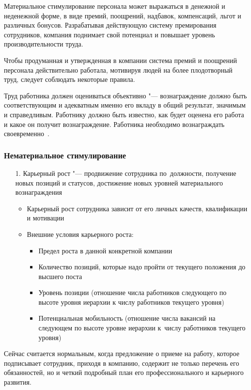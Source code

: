 \documentclass{../industrial-development}
\begin{document}
Материальное стимулирование персонала может выражаться в денежной и неденежной форме, в виде премий, поощрений, надбавок, компенсаций, льгот и различных бонусов. Разрабатывая действующую систему премирования сотрудников, компания поднимает свой потенциал и повышает уровень производительности труда.

Чтобы продуманная и утвержденная в компании система премий и поощрений персонала действительно работала, мотивируя людей на более плодотворный труд, следует соблюдать некоторые правила.

Труд работника должен оцениваться объективно "--- вознаграждение должно быть соответствующим и адекватным именно его вкладу в общий результат, значимым и справедливым. Работнику должно быть известно, как будет оценена его работа и какое он получит вознаграждение. Работника необходимо вознаграждать своевременно~\cite{MotivPerson}.

\begin{frame} \frametitle{Нематериальное стимулирование}
	\begin{itemize}
		\item[1.] \alert{Карьерный рост} "--- продвижение сотрудника по~должности, получение новых позиций и статусов, достижение новых уровней материального вознаграждения
		\begin{itemize}
			
			\item Карьерный рост сотрудника зависит от его личных качеств, квалификации и мотивации
			\item Внешние условия карьерного роста:
			\begin{itemize}
				\item Предел роста в данной конкретной компании
				\item Количество позиций, которые надо пройти от текущего положения до высшего поста
				\item Уровень позиции (отношение числа работников следующего по высоте уровня иерархии к числу работников текущего уровня)
				\item Потенциальная мобильность (отношение числа вакансий на следующем по высоте уровне иерархии к~числу работников текущего уровня)
			\end{itemize}
		\end{itemize}
	\end{itemize}
\end{frame}

\lecturenotes

Сейчас считается нормальным, когда предложение о приеме на работу, которое подписывает сотрудник, приходя в компанию, содержит не только перечень его обязанностей, но и четкий подробный план его профессионального и карьерного развития.
\end{document}
